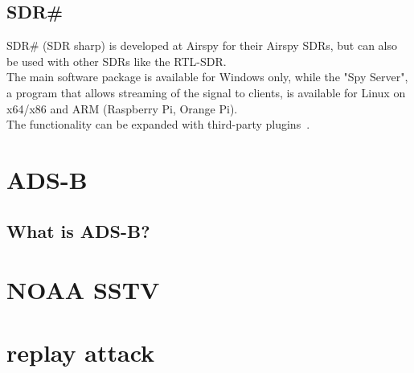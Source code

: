 \documentclass[conference]{IEEEtran}
\begin{document}
\subsection{SDR\#}
SDR\# (SDR sharp) is developed at Airspy for their Airspy SDRs, but can also be used with other SDRs like the RTL-SDR.\\The main software package is available for Windows only, while the "Spy Server", a program that allows streaming of the signal to clients, is available for Linux on x64/x86 and ARM (Raspberry Pi, Orange Pi).\\
The functionality can be expanded with third-party plugins~\cite{SDRsharp19Download}.

\section{ADS-B}
\subsection{What is ADS-B?}


\section{NOAA SSTV} %

\section{replay attack} %


%
%
\end{document}
